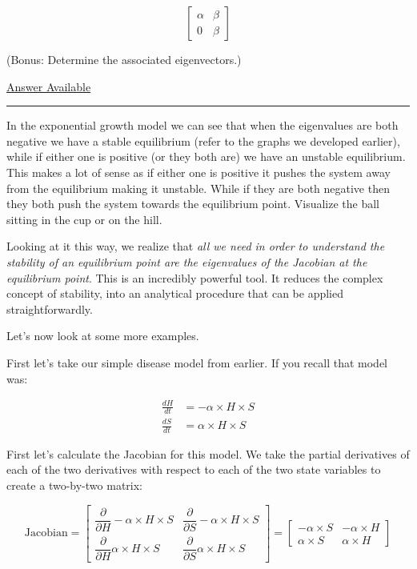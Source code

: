 \documentclass[]{memoir}
\begin{document}

\[
\begin{bmatrix} \alpha & \beta \\  0 & \beta \end{bmatrix}
\]

(Bonus: Determine the associated eigenvectors.)

\hyperref[Ans-11-15]{Answer Available}

\begin{center}\rule{3in}{0.4pt}\end{center}

In the exponential growth model we can see that when the eigenvalues are
both negative we have a stable equilibrium (refer to the graphs we
developed earlier), while if either one is positive (or they both are)
we have an unstable equilibrium. This makes a lot of sense as if either
one is positive it pushes the system away from the equilibrium making it
unstable. While if they are both negative then they both push the system
towards the equilibrium point. Visualize the ball sitting in the cup or
on the hill.

Looking at it this way, we realize that \emph{all we need in order to
understand the stability of an equilibrium point are the eigenvalues of
the Jacobian at the equilibrium point}. This is an incredibly powerful
tool. It reduces the complex concept of stability, into an analytical
procedure that can be applied straightforwardly.

Let's now look at some more examples.

First let's take our simple disease model from earlier. If you recall
that model was:

\[
\begin{aligned}
\frac{dH}{dt} &= - \alpha \times H \times S \\ 
\frac{dS}{dt} &= \alpha \times H \times S
\end{aligned}
\]

First let's calculate the Jacobian for this model. We take the partial
derivatives of each of the two derivatives with respect to each of the
two state variables to create a two-by-two matrix:

\[
\text{Jacobian} = \begin{bmatrix} \dfrac{\partial}{\partial H }  - \alpha \times H \times S& \dfrac{\partial}{\partial S }  - \alpha \times H \times S  \\  \dfrac{\partial}{\partial H } \alpha \times H \times S & \dfrac{\partial}{\partial S } \alpha \times H \times S \end{bmatrix} =\begin{bmatrix}
-\alpha \times S & -\alpha \times H \\
\alpha \times S & \alpha \times H
\end{bmatrix}
\]
\end{document}

